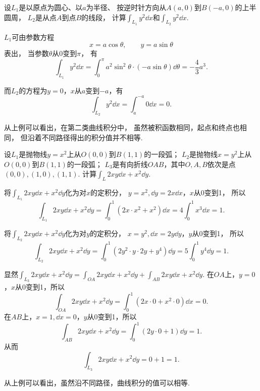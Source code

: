 \begin{example}
设\(L_1\)是以原点为圆心、以\(a\)为半径、
按逆时针方向从\(A(a,0)\)到\(B(-a,0)\)的上半圆周，
\(L_2\)是从点\(A\)到点\(B\)的线段，
计算\(\int_{L_1} y^2 \dd{x}\)和\(\int_{L_2} y^2 \dd{x}\).
\begin{solution}
\(L_1\)可由参数方程\[
	x = a \cos\theta,
	\qquad
	y = a \sin\theta
\]表出，
当参数\(\theta\)从\(0\)变到\(\pi\)，
有\[
	\int_{L_1} y^2 \dd{x}
	= \int_0^\pi a^2 \sin^2 \theta \cdot (-a \sin\theta) \dd{\theta}
	= -\frac{4}{3} a^3.
\]

而\(L_2\)的方程为\(y=0\)，\(x\)从\(a\)变到\(-a\)，有\[
	\int_{L_2} y^2 \dd{x} = \int_a^{-a} 0 \dd{x} = 0.
\]
\end{solution}
\end{example}
从上例可以看出，在第二类曲线积分中，
虽然被积函数相同，起点和终点也相同，
但沿着不同路径得出的积分值并不相等.

\begin{example}
设\(L_1\)是抛物线\(y=x^2\)上从\(O(0,0)\)到\(B(1,1)\)的一段弧；
\(L_2\)是抛物线\(x=y^2\)上从\(O(0,0)\)到\(B(1,1)\)的一段弧；
\(L_3\)是有向折线\(OAB\)，其中\(O,A,B\)依次是点\((0,0),(1,0),(1,1)\).
计算\(\int_L 2xy\dd{x}+x^2\dd{y}\).
\begin{solution}
将\(\int_{L_1} 2xy\dd{x}+x^2\dd{y}\)化为对\(x\)的定积分，
\(y=x^2, \dd{y}=2x\dd{x}\)，\(x\)从0变到1，
所以\[
	\int_{L_1} 2xy\dd{x}+x^2\dd{y}
	= \int_0^1 (2x \cdot x^2 + x^2) \dd{x}
	= 4 \int_0^1 x^3 \dd{x} = 1.
\]

将\(\int_{L_2} 2xy\dd{x}+x^2\dd{y}\)化为对\(y\)的定积分，
\(x=y^2, \dd{x}=2y\dd{y}\)，\(y\)从0变到1，
所以\[
	\int_{L_2} 2xy\dd{x}+x^2\dd{y}
	= \int_0^1 (2y^2 \cdot y \cdot 2y + y^4) \dd{y}
	= 5 \int_0^1 y^4 \dd{y} = 1.
\]

显然\(\int_{L_3} 2xy\dd{x}+x^2\dd{y}
= \int_{OA} 2xy\dd{x}+x^2\dd{y}
+ \int_{AB} 2xy\dd{x}+x^2\dd{y}\).
在\(OA\)上，\(y=0\)，\(x\)从0变到1，所以\[
	\int_{OA} 2xy\dd{x}+x^2\dd{y}
	= \int_0^1 (2x\cdot0+x^2\cdot0) \dd{x} = 0.
\]
在\(AB\)上，\(x=1, \dd{x}=0\)，\(y\)从0变到1，所以\[
	\int_{AB} 2xy\dd{x}+x^2\dd{y}
	= \int_0^1 (2y\cdot0+1) \dd{y} = 1.
\]
从而\[
	\int_{L_3} 2xy\dd{x}+x^2\dd{y} = 0 + 1 = 1.
\]
\end{solution}
\end{example}
从上例可以看出，虽然沿不同路径，曲线积分的值可以相等.

